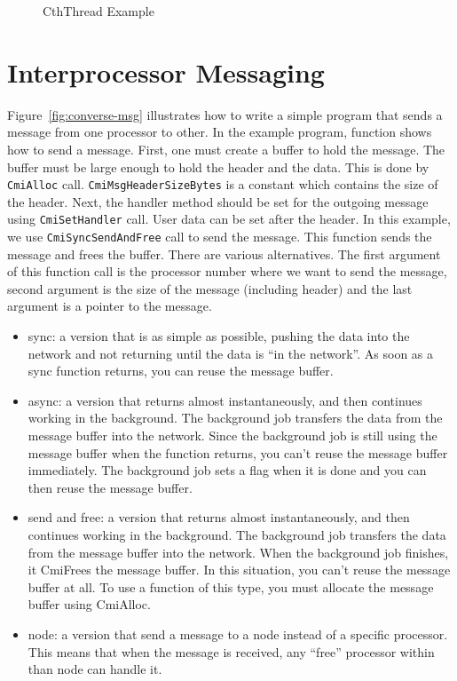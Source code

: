 \documentclass[10pt]{report}
\begin{document}
\begin{figure}
 \caption{CthThread Example}
 \label{fig:converse-cth}
\end{figure}


\section{Interprocessor Messaging}

Figure~\ref{fig:converse-msg} illustrates how to write a simple program that sends a message from one processor to other. In the example program, function  shows how to send a message. First, one must create a buffer to hold the message. The buffer must be large enough to hold the header and the data. This is done by \texttt{CmiAlloc} call. \texttt{CmiMsgHeaderSizeBytes} is a constant which contains the size of the header. Next, the handler method should be set for the outgoing message using \texttt{CmiSetHandler} call. User data can be set after the header. In this example, we use \texttt{CmiSyncSendAndFree} call to send the message. This function sends the message and frees the buffer. There are various alternatives. The first argument of this function call is the processor number where we want to send the message, second argument is the size of the message (including header) and the last argument is a pointer to the message.
\begin{itemize}
\item
sync: a version that is as simple as possible, pushing the data into the network and not returning until the data is ``in the network''. As soon as a sync function returns, you can reuse the message buffer.

\item
async: a version that returns almost instantaneously, and then continues working in the background. The background job transfers the data from the message buffer into the network. Since the background job is still using the message buffer when the function returns, you can't reuse the message buffer immediately. The background job sets a flag when it is done and you can then reuse the message buffer.

\item
send and free: a version that returns almost instantaneously, and then continues working in the background. The background job transfers the data from the message buffer into the network. When the background job finishes, it CmiFrees the message buffer. In this situation, you can't reuse the message buffer at all. To use a function of this type, you must allocate the message buffer using CmiAlloc.

\item
node: a version that send a message to a node instead of a specific processor. This means that when the message is received, any ``free'' processor within than node can handle it. 
\end{itemize}
\end{document}
